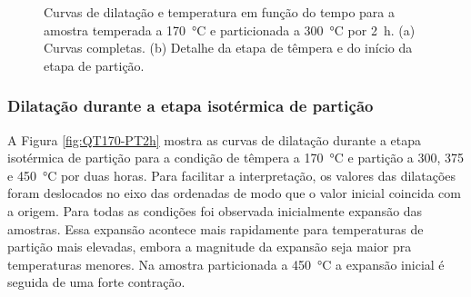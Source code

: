 \begin{figure}
  \vspace{0pt}
  \caption{Curvas de dilatação e temperatura em função do tempo para a amostra temperada a \SI{170}{\degreeCelsius} e particionada a \SI{300}{\degreeCelsius} por 2~h. (a) Curvas completas. (b) Detalhe da etapa de têmpera e do início da etapa de partição.}
  \label{fig:TP170-300}
\end{figure}

\subsubsection{Dilatação durante a etapa isotérmica de partição}

A Figura \ref{fig:QT170-PT2h} mostra as curvas de dilatação durante a etapa isotérmica de partição para a condição de têmpera a \SI{170}{\degreeCelsius} e partição a 300, 375 e \SI{450}{\degreeCelsius} por duas horas. Para facilitar a interpretação, os valores das dilatações foram deslocados no eixo das ordenadas de modo que o valor inicial coincida com a origem. Para todas as condições foi observada inicialmente expansão das amostras. Essa expansão acontece mais rapidamente para temperaturas de partição mais elevadas, embora a magnitude da expansão seja maior pra temperaturas menores. Na amostra particionada a \SI{450}{\degreeCelsius} a expansão inicial é seguida de uma forte contração. 

